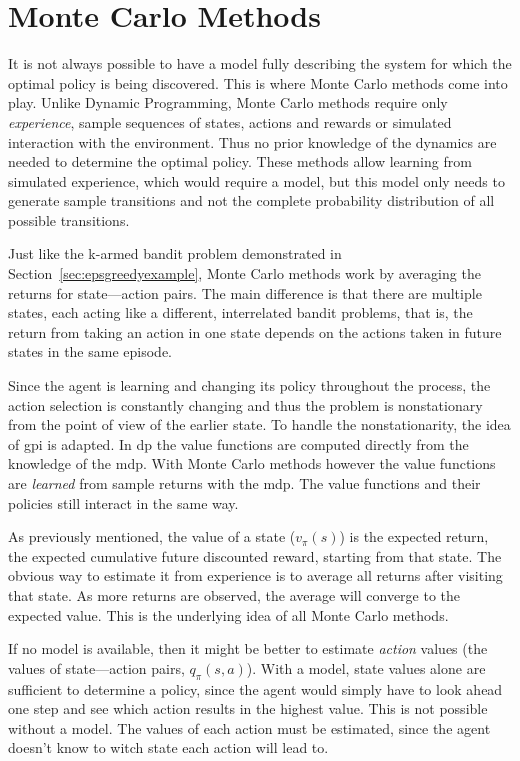 \section{Monte Carlo Methods}
It is not always possible to have a model fully describing the system for which the optimal policy is being discovered. This is where Monte Carlo methods come into play. Unlike Dynamic Programming, Monte Carlo methods require only \emph{experience}, sample sequences of states, actions and rewards or simulated interaction with the environment. Thus no prior knowledge of the dynamics are needed to determine the optimal policy. These methods allow learning from simulated experience, which would require a model, but this model only needs to generate sample transitions and not the complete probability distribution of all possible transitions.

Just like the k-armed bandit problem demonstrated in Section~\ref{sec:epsgreedyexample}, Monte Carlo methods work by averaging the returns for state---action pairs. The main difference is that there are multiple states, each acting like a different, interrelated bandit problems, that is, the return from taking an action in one state depends on the actions taken in future states in the same episode.

Since the agent is learning and changing its policy throughout the process, the action selection is constantly changing and thus the problem is nonstationary from the point of view of the earlier state. To handle the nonstationarity, the idea of \acrfull{gpi} is adapted. In \gls{dp} the value functions are computed directly from the knowledge of the \gls{mdp}. With Monte Carlo methods however the value functions are \emph{learned} from sample returns with the \gls{mdp}. The value functions and their policies still interact in the same way.

As previously mentioned, the value of a state ($v_\pi(s)$) is the expected return, the expected cumulative future discounted reward, starting from that state. The obvious way to estimate it from experience is to average all returns after visiting that state. As more returns are observed, the average will converge to the expected value. This is the underlying idea of all Monte Carlo methods. 

If no model is available, then it might be better to estimate \emph{action} values (the values of state---action pairs, $q_\pi(s, a)$). With a model, state values alone are sufficient to determine a policy, since the agent would simply have to look ahead one step and see which action results in the highest value. This is not possible without a model. The values of each action must be estimated, since the agent doesn't know to witch state each action will lead to.


